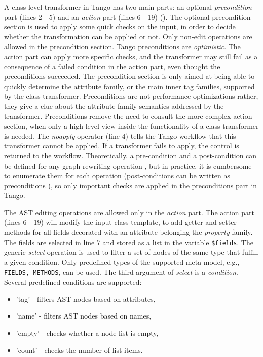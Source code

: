 A class level transformer in Tango has two main parts: an optional \textit{precondition} part (lines 2 - 5) and an \textit{action} part (lines 6 - 19) (). The optional precondition section is used to apply some quick checks on the input, in order to decide whether the transformation can be applied or not. Only non-edit operations are allowed in the precondition section. Tango preconditions are \textit{optimistic}. The action part can apply more specific checks, and the transformer may still fail as a consequence of a failed condition in the action part, even thought the preconditions succeeded. The precondition section is only aimed at being able to quickly determine the attribute family, or the main inner tag families, supported by the class transformer. Preconditions are not performance optimizations rather, they give a clue about the attribute family semantics addressed by the transformer. Preconditions remove the need to consult the more complex action section, when only a high-level view inside the functionality of a class transformer is needed. The \textit{noapply} operator (line 4) tells the Tango workflow that this transformer cannot be applied. If a transformer fails to apply, the control is returned to the workflow. Theoretically, a pre-condition and a post-condition  can be defined for any graph rewriting operation \cite{mens.99}, but in practice, it is cumbersome to enumerate them for each operation (post-conditions can be written as preconditions \cite{mens.99}), so only important checks are applied in the preconditions part in Tango.

The AST editing operations are allowed only in the \textit{action} part. The action part (lines 6 - 19) will modify the input class template, to add getter and setter methods for all fields decorated with an attribute belonging the \textit{property} family. The fields are selected in line 7 and stored as a list in the variable {\tt \$fields}. The generic \textit{select} operation is used to filter a set of nodes of the same type that fulfill a given condition. Only predefined types of the supported meta-model, e.g., {\tt FIELDS, ME\-THODS}, can be used. The third argument of \textit{select} is a \textit{condition}. Several predefined conditions are supported:
\begin{itemize}
\item 'tag' - filters AST nodes based on attributes,
\item 'name' - filters AST nodes based on names,
\item 'empty' - checks whether a node list is empty,
\item 'count' - checks the number of list items.
\end{itemize}

